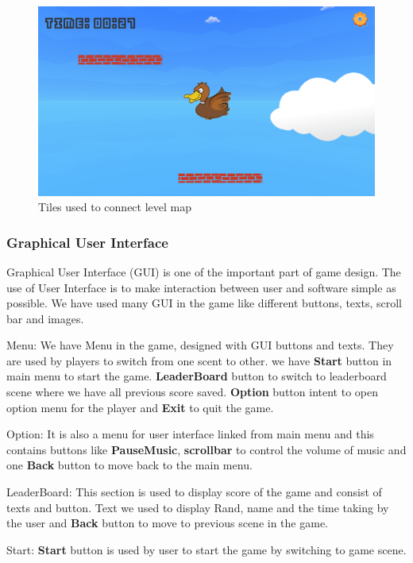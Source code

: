\documentclass[12pt]{article}
\begin{document}
\begin{figure}[H]
\centering
\includegraphics[scale=0.17]{tiles.png}
\caption{Tiles used to connect level map}
\label{tiles}
\end{figure}

\subsubsection{Graphical User Interface}
 
 Graphical User Interface (GUI) is one of the important part of game design. The use of User Interface is to make interaction between user and software simple as possible. We have used many GUI in the game like different buttons, texts, scroll bar and images.
 
 Menu: We have Menu in the game, designed with GUI buttons and texts. They are used by players to switch from one scent to other.
 we have \textbf {Start} button in main menu to start the game.
 \textbf{LeaderBoard} button to switch to leaderboard scene where we have all previous score saved. \textbf{Option} button intent to open option menu for the player and \textbf{Exit} to quit the game.
 
 Option: It is also a menu for user interface linked from main menu and this contains buttons like \textbf{PauseMusic}, \textbf{scrollbar} to control the volume of music and one \textbf{Back} button to move back to the main menu.
 
 LeaderBoard: This section is used to display score of the game and consist of texts and button. Text we used to display Rand, name and the time taking by the user and \textbf{Back} button to move to previous scene in the game.
 
 Start: \textbf{Start} button is used by user to start the game by switching to game scene.
 
\end{document}

